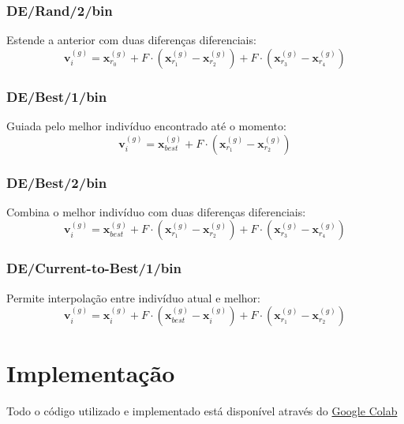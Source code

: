 \documentclass[runningheads]{llncs}
\begin{document}
\subsubsection{DE/Rand/2/bin}
Estende a anterior com duas diferenças diferenciais:
\begin{equation}
\mathbf{v}_i^{(g)} = \mathbf{x}_{r_0}^{(g)} + F \cdot (\mathbf{x}_{r_1}^{(g)} - \mathbf{x}_{r_2}^{(g)}) + F \cdot (\mathbf{x}_{r_3}^{(g)} - \mathbf{x}_{r_4}^{(g)})
\end{equation}

\subsubsection{DE/Best/1/bin}
Guiada pelo melhor indivíduo encontrado até o momento:
\begin{equation}
\mathbf{v}_i^{(g)} = \mathbf{x}_{best}^{(g)} + F \cdot (\mathbf{x}_{r_1}^{(g)} - \mathbf{x}_{r_2}^{(g)})
\end{equation}

\subsubsection{DE/Best/2/bin}
Combina o melhor indivíduo com duas diferenças diferenciais:
\begin{equation}
\mathbf{v}_i^{(g)} = \mathbf{x}_{best}^{(g)} + F \cdot (\mathbf{x}_{r_1}^{(g)} - \mathbf{x}_{r_2}^{(g)}) + F \cdot (\mathbf{x}_{r_3}^{(g)} - \mathbf{x}_{r_4}^{(g)})
\end{equation}

\subsubsection{DE/Current-to-Best/1/bin}
Permite interpolação entre indivíduo atual e melhor:
\begin{equation}
\mathbf{v}_i^{(g)} = \mathbf{x}_i^{(g)} + F \cdot (\mathbf{x}_{best}^{(g)} - \mathbf{x}_i^{(g)}) + F \cdot (\mathbf{x}_{r_1}^{(g)} - \mathbf{x}_{r_2}^{(g)})
\end{equation}

\section{Implementação}

Todo o código utilizado e implementado está disponível através do \href{https://colab.research.google.com/drive/1FURgonu42so-3gzqpQ3TUvHymYsYw38M?usp=sharing}{Google Colab}
\end{document}
